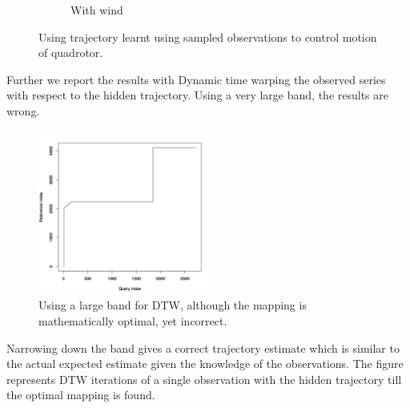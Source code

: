 \documentclass[hidelinks,BTech]{iitmdiss}
\begin{document}
\begin{figure}[H]
\begin{subfigure}[t]{0.48\textwidth}
      \caption{With wind}
  \end{subfigure}
  \caption{Using trajectory learnt using sampled observations to control motion of quadrotor.}
\end{figure}
Further we report the results with Dynamic time warping the observed series with respect to the hidden trajectory. Using a very large band, the results are wrong.
\begin{figure}[H]
  \centering
    \includegraphics[width=0.5\textwidth]{DTW_no_band.png}
    \caption{Using a large band for DTW, although the mapping is mathematically optimal, yet incorrect.}
\end{figure}	
Narrowing down the band gives a correct trajectory estimate which is similar to the actual expected estimate given the knowledge of the observations. The figure represents DTW iterations of a single observation with the hidden trajectory till the optimal mapping is found.
\end{document}
